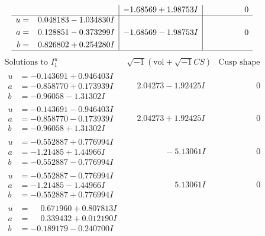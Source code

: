 \documentclass[1p]{elsarticle_modified}
\theoremstyle{definition}
\newcommand{\I}{\sqrt{-1}}
\begin{document}
$$\begin{array}{c|c|c}
 & -1.68569 + 1.98753 I & \phantom{-0.000000 } 0 \\ \hline\begin{aligned}
u &= \phantom{-}0.048183 - 1.034830 I \\
a &= \phantom{-}0.128851 - 0.373299 I \\
b &= \phantom{-}0.826802 + 0.254280 I\end{aligned}
 & -1.68569 - 1.98753 I & \phantom{-0.000000 } 0\\
 \hline 
 \end{array}$$\newpage$$\begin{array}{c|c|c}  
\text{Solutions to }I^u_{1}& \I (\text{vol} + \sqrt{-1}CS) & \text{Cusp shape}\\
 \hline 
\begin{aligned}
u &= -0.143691 + 0.946403 I \\
a &= -0.858770 + 0.173939 I \\
b &= -0.96058 - 1.31302 I\end{aligned}
 & \phantom{-}2.04273 - 1.92425 I & \phantom{-0.000000 } 0 \\ \hline\begin{aligned}
u &= -0.143691 - 0.946403 I \\
a &= -0.858770 - 0.173939 I \\
b &= -0.96058 + 1.31302 I\end{aligned}
 & \phantom{-}2.04273 + 1.92425 I & \phantom{-0.000000 } 0 \\ \hline\begin{aligned}
u &= -0.552887 + 0.776994 I \\
a &= -1.21485 + 1.44966 I \\
b &= -0.552887 - 0.776994 I\end{aligned}
 & \phantom{-0.000000 } -5.13061 I & \phantom{-0.000000 } 0 \\ \hline\begin{aligned}
u &= -0.552887 - 0.776994 I \\
a &= -1.21485 - 1.44966 I \\
b &= -0.552887 + 0.776994 I\end{aligned}
 & \phantom{-0.000000 -}5.13061 I & \phantom{-0.000000 } 0 \\ \hline\begin{aligned}
u &= \phantom{-}0.671960 + 0.807813 I \\
a &= \phantom{-}0.339432 + 0.012190 I \\
b &= -0.189179 - 0.240700 I\end{aligned}

\end{array}$$
\end{document}
